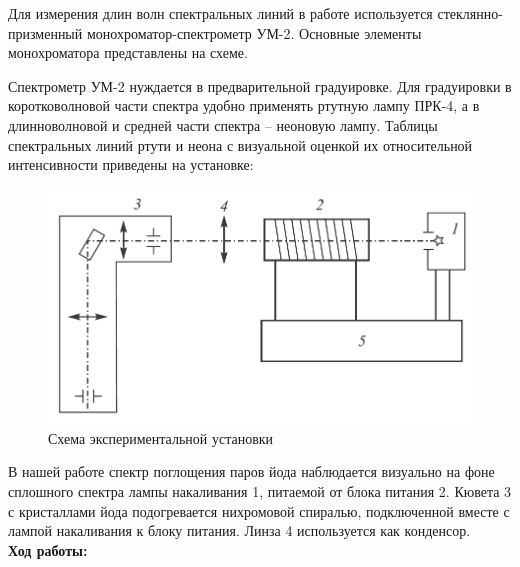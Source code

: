\documentclass[a4paper, 12pt]{article}%
\begin{document}
	Для измерения длин волн спектральных линий в работе используется стеклянно-призменный монохроматор-спектрометр УМ-2.  Основные элементы монохроматора представлены на схеме.

	Спектрометр УМ-2 нуждается в предварительной градуировке.  Для градуировки в коротковолновой части спектра удобно применять ртутную лампу ПРК-4,  а в длинноволновой и средней части спектра -- неоновую лампу.  Таблицы спектральных линий ртути и неона с визуальной оценкой их относительной интенсивности приведены на установке:

	\begin{figure}[h!]
		\centering
		\includegraphics[scale=0.45]{Установка_2.PNG}
		\caption{Схема экспериментальной установки}
	\end{figure}

	В нашей работе спектр поглощения паров йода наблюдается визуально на фоне сплошного спектра лампы накаливания 1,  питаемой от блока питания 2.  Кювета 3 с кристаллами йода подогревается нихромовой спиралью, подключенной вместе с лампой накаливания к блоку питания. Линза 4 используется как конденсор.\\

\textbf{Ход работы:}\\\par
\end{document}
